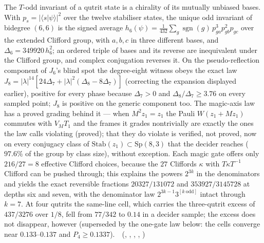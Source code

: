 The $T$-odd invariant of a qutrit state is a chirality of its mutually unbiased bases. With $p_s=\lvert\langle s|\psi\rangle\rvert^2$ over
the twelve stabiliser states, the unique odd invariant of bidegree $(6,6)$ is the signed average
$h_6(\psi)=\frac1{432}\sum_g\operatorname{sgn}(g)\,p_{ga}^3p_{gb}^2p_{gc}$ over the extended Clifford group, with $a,b,c$ in three
different bases, and $\Delta_6=349920\,h_6^2$; an ordered triple of bases and its reverse are inequivalent under the Clifford group,
and complex conjugation reverses it. On the pseudo-reflection component of $J_6$'s blind spot the degree-eight witness obeys the
exact law $J_8=\lvert\lambda\rvert^{14}[24\Delta_7+\lvert\lambda\rvert^2(\Delta_8-8\Delta_7)]$ (correcting the expansion displayed earlier), positive for
every phase because $\Delta_7>0$ and $\Delta_8/\Delta_7\ge3.76$ on every sampled point; $J_8$ is positive on the generic component too.
The magic-axis law has a proved grading behind it --- when $M^2z_1=z_1$ the Pauli $W(z_1+Mz_1)$ commutes with $V_MT_1$ and the
frames it grades nontrivially are exactly the ones the law calls violating (proved); that they do violate is verified, not
proved, now on every conjugacy class of $\mathrm{Stab}(z_1)\subset\mathrm{Sp}(8,3)$ that the decider reaches ($97.6\%$ of the group by
class size), without exception. Each magic gate offers
only $216/27=8$ effective Clifford choices, because the $27$ Cliffords $\kappa$ with $T\kappa T^{-1}$ Clifford can be pushed
through; this explains the powers $2^{3k}$ in the denominators and yields the exact reversible fractions $20327/131072$ and
$353927/3145728$ at depths six and seven, with the denominator law $2^{3k-1}3^{[k\ \mathrm{odd}]}$ intact through $k=7$. At four
qutrits the same-line cell, which carries the three-qutrit excess of $437/3276$ over $1/8$, fell from
$77/342$ to $0.14$ in a decider sample; the excess does not disappear, however (superseded by the one-gate law below: the cells converge near $0.133$--$0.137$ and $P_4\ge0.1337$). \tierT\,\tierC\ (, ,
, , )

